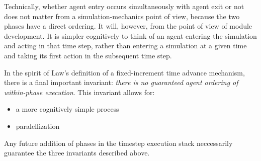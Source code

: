 Technically, whether agent entry occurs simultaneously with agent exit or not
does not matter from a simulation-mechanics point of view, because the two
phases have a direct ordering. It will, however, from the point of view of
module development. It is simpler cognitively to think of an agent entering the
simulation and acting in that time step, rather than entering a simulation at a
given time and taking its first action in the subsequent time step.

In the spirit of Law's definition of a fixed-increment time advance mechanism,
there is a final important invariant: \textit{there is no guaranteed agent
  ordering of within-phase execution}. This invariant allows for:

\begin{itemize}
\item a more cognitively simple process
\item paralellization
\end{itemize}

Any future addition of phases in the timestep execution stack neccessarily
guarantee the three invariants described above.
